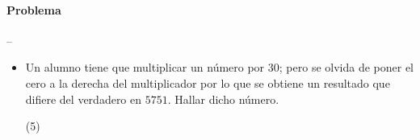 \documentclass[12pt, a4paper]{article}
\begin{document}
\paragraph*{Problema} -- \\
\begin{itemize}
\item{Un alumno tiene que multiplicar un número por $30$; pero se olvida de poner el cero a la derecha del multiplicador por lo que se obtiene un resultado que difiere del verdadero en $5751$. Hallar dicho número.
	\begin{tasks}(5)
	\end{tasks}
}
\end{itemize}
\end{document}

